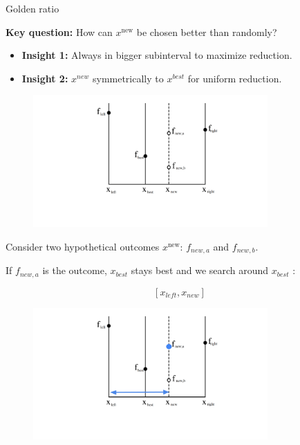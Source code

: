 \documentclass[11pt,compress,t,notes=noshow, xcolor=table]{beamer}
\begin{document}
\begin{vbframe}{Golden ratio}

\textbf{Key question:} How can $x^{\text{new}}$ be chosen better than randomly? 

\begin{itemize}
    \item \textbf{Insight 1: } Always in bigger subinterval to maximize reduction.
    \item \textbf{Insight 2: } $x^{new}$ symmetrically to $x^{best}$ for uniform reduction. 
\end{itemize}

\begin{figure}
\includegraphics[width=0.8\textwidth]{figure_man/goldensec-0.png}
\end{figure}

\vspace*{-0.5cm}

Consider two hypothetical outcomes $x^{\text{new}}$: $f_{new, a}$ and $f_{new, b}$. 

\framebreak

If $f_{new, a}$ is the outcome, $x_{best}$ stays best and we search around $x_{best}$ : 

$$
    [x_{left}, x_{new}]
$$

\begin{figure}
\includegraphics[width=0.8\textwidth]{figure_man/goldensec-1.png}\\
\end{figure}


\end{vbframe}
\end{document}
